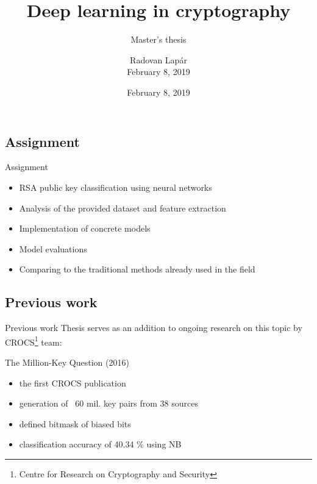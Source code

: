 \documentclass{beamer}
\title[Deep learning in cryptography]{Deep learning in cryptography}
\subtitle{Master's thesis}
\author[R.\,Lap\'{a}r]{Radovan Lap\'{a}r \\ February 8, 2019}
\institute[FI MU]{Faculty of Informatics, Masaryk University}
\date{February 8, 2019}
\newcommand\Fontsmall{\fontsize{8}{7.2}\selectfont}
\let\oldfootnote\footnote
\renewcommand\footnote[1][]{\oldfootnote[frame,#1]}
\begin{document}
  \frame{\maketitle}


  \begin{darkframes}
    \section{Assignment}

    \begin{frame}{Assignment}
      \begin{itemize}
        \item RSA public key classification using neural networks
        \vspace{3mm}
        \item Analysis of the provided dataset and feature extraction
        \vspace{3mm}
        \item Implementation of concrete models
        \vspace{3mm}
        \item Model evaluations
        \vspace{3mm}
        \item Comparing to the traditional methods already used in the field
      \end{itemize}
    \end{frame}

    \subsection{Previous work}

    \begin{frame}{Previous work}   
    \Fontsmall   
    Thesis serves as an addition to ongoing research on this topic by CROCS\footnote{Centre for Research on Cryptography and Security} team:
    \begin{exampleblock}{The Million-Key Question (2016)}
      \begin{itemize}
        \item the first CROCS publication
        \item generation of ~60 mil. key pairs from 38 sources
        \item defined bitmask of biased bits
        \item classification accuracy of 40.34 \% using NB
      \end{itemize}
    \end{exampleblock}
    

\end{frame}
\end{darkframes}
\end{document}
